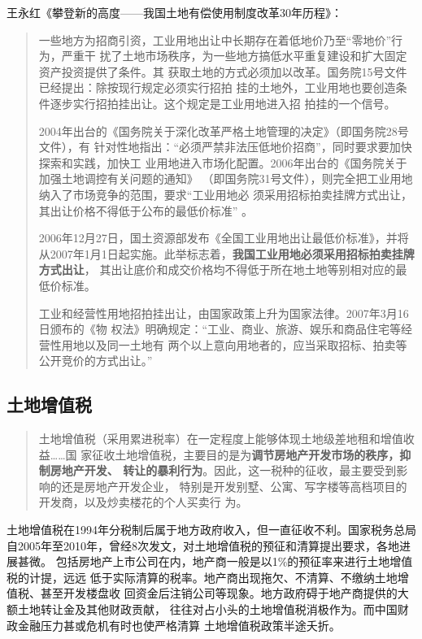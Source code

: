 王永红《攀登新的高度——我国土地有偿使用制度改革30年历程》：
\begin{quotation}
一些地方为招商引资，工业用地出让中长期存在着低地价乃至“零地价”行为，严重干
扰了土地市场秩序，为一些地方搞低水平重复建设和扩大固定资产投资提供了条件。其
获取土地的方式必须加以改革。国务院15号文件已经提出：除按现行规定必须实行招拍
挂的土地外，工业用地也要创造条件逐步实行招拍挂出让。这个规定是工业用地进入招
拍挂的一个信号。

2004年出台的《国务院关于深化改革严格土地管理的决定》（即国务院28号文件），有
针对性地指出：“必须严禁非法压低地价招商”，同时要求要加快探索和实践，加快工
业用地进入市场化配置。2006年出台的《国务院关于加强土地调控有关问题的通知》
（即国务院31号文件），则完全把工业用地纳入了市场竞争的范围，要求“工业用地必
须采用招标拍卖挂牌方式出让，其出让价格不得低于公布的最低价标准” 。

2006年12月27日，国土资源部发布《全国工业用地出让最低价标准》，并将
从2007年1月1日起实施。此举标志着，\textbf{我国工业用地必须采用招标拍卖挂牌方式出让}，
其出让底价和成交价格均不得低于所在地土地等别相对应的最低价标准。

工业和经营性用地招拍挂出让，由国家政策上升为国家法律。2007年3月16日颁布的《物
权法》明确规定：“工业、商业、旅游、娱乐和商品住宅等经营性用地以及同一土地有
两个以上意向用地者的，应当采取招标、拍卖等公开竞价的方式出让。”
\end{quotation}

\subsection{土地增值税}

\begin{quotation}
  土地增值税（采用累进税率）在一定程度上能够体现土地级差地租和增值收益……国
  家征收土地增值税，主要目的是为\textbf{调节房地产开发市场的秩序，抑制房地产开发、
    转让的暴利行为}。因此，这一税种的征收，最主要受到影响的还是房地产开发企业，
  特别是开发别墅、公寓、写字楼等高档项目的开发商，以及炒卖楼花的个人买卖行
  为。\cite{yangdi}
\end{quotation}

土地增值税在1994年分税制后属于地方政府收入，但一直征收不利。国家税务总局
自2005年至2010年，曾经8次发文，对土地增值税的预征和清算提出要求，各地进展甚微。
包括房地产上市公司在内，地产商一般是以1\%的预征率来进行土地增值税的计提，远远
低于实际清算的税率。地产商出现拖欠、不清算、不缴纳土地增值税、甚至开发楼盘收
回资金后注销公司等现象。地方政府碍于地产商提供的大额土地转让金及其他财政贡献，
往往对占小头的土地增值税消极作为。而中国财政金融压力甚或危机有时也使严格清算
土地增值税政策半途夭折。

